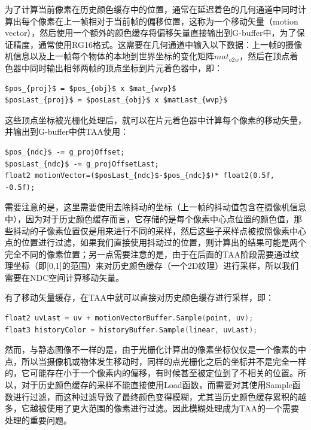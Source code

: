 为了计算当前像素在历史颜色缓存中的位置，通常在延迟着色的几何通道中同时计算出每个像素在上一帧相对于当前帧的偏移位置，这称为一个移动矢量（motion vector），然后使用一个额外的颜色缓存将偏移矢量直接输出到G-buffer中，为了保证精度，通常使用RG16格式。这需要在几何通道中输入以下数据：上一帧的摄像机信息以及上一帧每个物体的本地到世界坐标的变化矩阵$mat_{o2w}$，然后在顶点着色器中同时输出相邻两帧的顶点坐标到片元着色器中，即：

\begin{lstlisting}[mathescape=true]
$pos_{proj}$ = $pos_{obj}$ x $mat_{wvp}$
$posLast_{proj}$ = $posLast_{obj}$ x $matLast_{wvp}$
\end{lstlisting}

这些顶点坐标被光栅化处理后，就可以在片元着色器中计算每个像素的移动矢量，并输出到G-buffer中供TAA使用：

\begin{lstlisting}[mathescape=true]
$pos_{ndc}$ -= g_projOffset;
$posLast_{ndc}$ -= g_projOffsetLast;
float2 motionVector=($posLast_{ndc}$-$pos_{ndc}$)* float2(0.5f, -0.5f);
\end{lstlisting}

需要注意的是，这里需要使用去除抖动的坐标（上一帧的抖动值包含在摄像机信息中），因为对于历史颜色缓存而言，它存储的是每个像素中心点位置的颜色值，那些抖动的子像素位置仅是用来进行不同的采样，然后这些子采样点被按照像素中心点的位置进行过滤，如果我们直接使用抖动过的位置，则计算出的结果可能是两个完全不同的像素位置；另一点需要注意的是，由于在后面的TAA阶段需要通过纹理坐标（即[0,1]的范围）来对历史颜色缓存（一个2D纹理）进行采样，所以我们需要在NDC空间计算移动矢量。

有了移动矢量缓存，在TAA中就可以直接对历史颜色缓存进行采样，即：

\begin{lstlisting}[language=C++]
float2 uvLast = uv + motionVectorBuffer.Sample(point, uv);
float3 historyColor = historyBuffer.Sample(linear, uvLast);
\end{lstlisting}

然而，与静态图像不一样的是，由于光栅化计算出的像素坐标仅仅是一个像素的中点，所以当摄像机或物体发生移动时，同样的点光栅化之后的坐标并不是完全一样的，它可能存在小于一个像素内的偏移，有时候甚至被定位到了不相关的位置\cite{a:TemporalAntialiasingInUncharted4}。所以，对于历史颜色缓存的采样不能直接使用Load函数，而需要对其使用Sample函数进行过滤，而这种过滤导致了最终颜色变得模糊，尤其当历史颜色缓存累积的越多，它越被使用了更大范围的像素进行过滤。因此模糊处理成为TAA的一个需要处理的重要问题。







